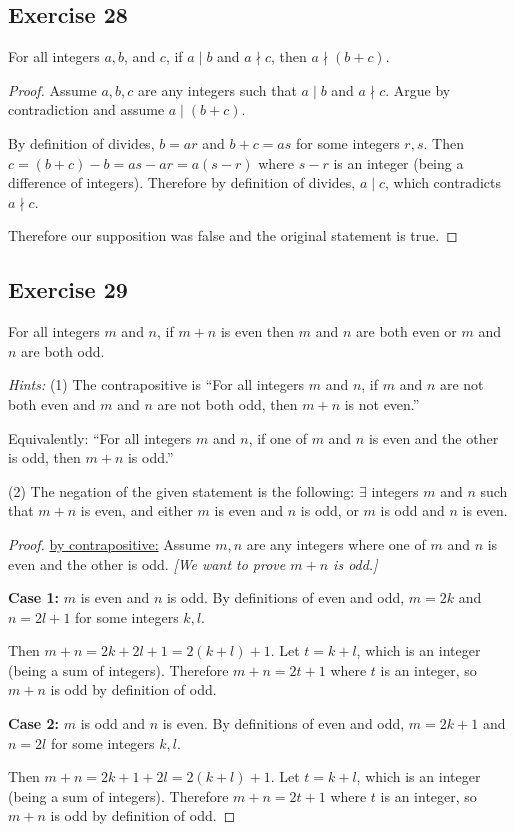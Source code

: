\documentclass[14pt]{extarticle}
\newcommand{\te}{\exists}
\begin{document}
\subsection{Exercise 28}
For all integers $a, b$, and $c$, if $a \mid b$ and $a \nmid c$, then $a \nmid (b + c)$.

\begin{proof}
    Assume $a,b,c$ are any integers such that $a \mid b$ and $a \nmid c$. Argue by contradiction and assume $a \mid (b+c)$.

    By definition of divides, $b = ar$ and $b+c = as$ for some integers $r,s$. Then $c = (b+c) - b = as - ar = a(s-r)$ where $s-r$ is an integer (being a difference of integers). Therefore by definition of divides, $a \mid c$, which contradicts $a \nmid c$.

    Therefore our supposition was false and the original statement is true.
\end{proof}

\subsection{Exercise 29}
For all integers $m$ and $n$, if $m + n$ is even then $m$
and $n$ are both even or $m$ and $n$ are both odd.

    {\it Hints:} (1) The contrapositive is “For all integers $m$ and $n$, if $m$ and $n$ are not both even and $m$ and $n$ are not both odd, then $m + n$ is not even.”

Equivalently: “For all integers $m$ and $n$, if one of $m$ and $n$ is even and the other is odd, then $m + n$ is odd.”

(2) The negation of the given statement is the following:
$\te$ integers $m$ and $n$ such that $m + n$ is even, and either $m$ is even and $n$ is odd, or $m$ is odd and $n$ is even.

\begin{proof}
    \underline{by contrapositive:} Assume $m,n$ are any integers where one of $m$ and $n$ is even and the other is odd. {\it [We want to prove $m+n$ is odd.]}

        {\bf Case 1:} $m$ is even and $n$ is odd. By definitions of even and odd, $m = 2k$ and $n = 2l+1$ for some integers $k,l$.

    Then $m+n = 2k + 2l+1 = 2(k+l)+1$. Let $t = k+l$, which is an integer (being a sum of integers). Therefore $m+n = 2t+1$ where $t$ is an integer, so $m+n$ is odd by definition of odd.

        {\bf Case 2:} $m$ is odd and $n$ is even. By definitions of even and odd, $m = 2k+1$ and $n = 2l$ for some integers $k,l$.

    Then $m+n = 2k + 1 + 2l = 2(k+l)+1$. Let $t = k+l$, which is an integer (being a sum of integers). Therefore $m+n = 2t+1$ where $t$ is an integer, so $m+n$ is odd by definition of odd.
\end{proof}
\end{document}
